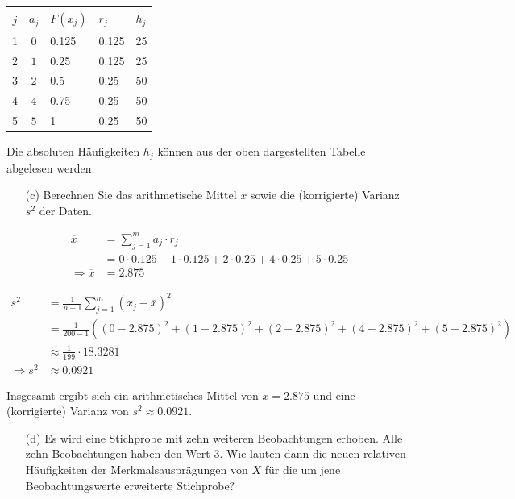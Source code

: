 \begin{table}[H]
\centering
\begin{tabular}{c|clll}
    $j$ & $a_j$ & $F(x_j)$ & $r_j$ & $h_j$ \\ \hline
    1   & $0$   & 0.125    & 0.125 & 25    \\
    2   & $1$   & 0.25     & 0.125 & 25    \\
    3   & $2$   & 0.5      & 0.25  & 50    \\
    4   & $4$   & 0.75     & 0.25  & 50    \\
    5   & $5$   & 1        & 0.25  & 50    \\
\end{tabular}
\end{table}

Die absoluten Häufigkeiten $h_j$ können aus der oben dargestellten Tabelle abgelesen werden.


\begin{task}
    \begin{enumerate}
        \item[(c)] Berechnen Sie das arithmetische Mittel $\overline{x}$ sowie die (korrigierte) Varianz $s^2$ der Daten.
    \end{enumerate}
\end{task}

$$
\begin{aligned}
    \overline{x} &= \sum_{j=1}^m a_j\cdot r_j \\
    &= 0\cdot 0.125 + 1\cdot 0.125 + 2\cdot 0.25 + 4\cdot 0.25 + 5\cdot 0.25 \\
    \Rightarrow \overline{x} &= 2.875
\end{aligned}
$$

$$
\begin{aligned}
    s^2 &= \frac{1}{n-1} \sum_{j=1}^m (x_j - \overline{x})^2 \\
    &= \frac{1}{200-1} ((0 - 2.875)^2 + (1 - 2.875)^2 + (2 - 2.875)^2 + (4 - 2.875)^2 + (5 - 2.875)^2) \\
    &\approx \frac{1}{199} \cdot 18.3281 \\
    \Rightarrow s^2 &\approx 0.0921
\end{aligned}
$$

Insgesamt ergibt sich ein arithmetisches Mittel von $\overline{x} = 2.875$ und eine (korrigierte) Varianz von $s^2 \approx 0.0921$.


\begin{task}
    \begin{enumerate}
        \item[(d)] Es wird eine Stichprobe mit zehn weiteren Beobachtungen erhoben. Alle zehn Beobachtungen haben den Wert $3$. Wie lauten dann die neuen relativen Häufigkeiten der Merkmalsausprägungen von $X$ für die um jene Beobachtungswerte erweiterte Stichprobe?
    \end{enumerate}
\end{task}

